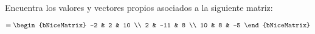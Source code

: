 \documentclass[../main.tex]{subfiles}
\begin{document}
\begin{problema}
	Encuentra los valores y vectores propios asociados a la siguiente matriz:

	\begin{equation*}
		[\vb{S}] =
		\begin{bNiceMatrix}
			-2 & 2   & 10 \\
			2  & -11 & 8  \\
			10 & 8   & -5
		\end{bNiceMatrix}
	\end{equation*}
\end{problema}
\end{document}
